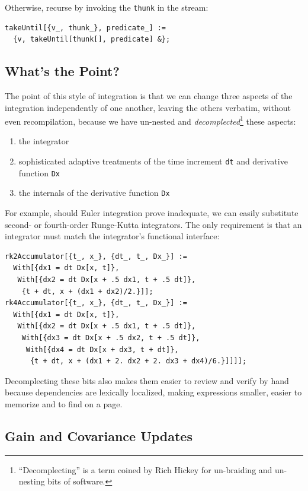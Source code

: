 \documentclass[10pt,oneside,x11names]{article}
\begin{document}
Otherwise, recurse by invoking the \texttt{thunk} in the stream:

\begin{verbatim}
takeUntil[{v_, thunk_}, predicate_] :=
  {v, takeUntil[thunk[], predicate] &};
\end{verbatim}

\subsection{What's the Point?}
\label{sec:orgheadline7}

The point of this style of integration is that we can change three aspects of
the integration independently of one another, leaving the others verbatim,
without even recompilation, because we have un-nested and \emph{decomplected}\footnote{``Decomplecting'' is a term coined by Rich Hickey for un-braiding and
un-nesting bits of software.} these aspects:
\begin{enumerate}
\item the integrator
\item sophisticated adaptive treatments of the time increment \texttt{dt} and derivative function \texttt{Dx}
\item the internals of the derivative function \texttt{Dx}
\end{enumerate}

For example, should Euler integration prove inadequate, we can easily substitute
second- or fourth-order Runge-Kutta integrators. The only requirement is that an
integrator must match the integrator's functional interface:

\begin{verbatim}
rk2Accumulator[{t_, x_}, {dt_, t_, Dx_}] :=
  With[{dx1 = dt Dx[x, t]},
   With[{dx2 = dt Dx[x + .5 dx1, t + .5 dt]},
    {t + dt, x + (dx1 + dx2)/2.}]];
rk4Accumulator[{t_, x_}, {dt_, t_, Dx_}] :=
  With[{dx1 = dt Dx[x, t]},
   With[{dx2 = dt Dx[x + .5 dx1, t + .5 dt]},
    With[{dx3 = dt Dx[x + .5 dx2, t + .5 dt]},
     With[{dx4 = dt Dx[x + dx3, t + dt]},
      {t + dt, x + (dx1 + 2. dx2 + 2. dx3 + dx4)/6.}]]]];
\end{verbatim}

Decomplecting these bits also makes them easier to review and verify by hand
because dependencies are lexically localized, making expressions smaller, easier
to memorize and to find on a page.

\subsection{Gain and Covariance Updates}
\label{sec:orgheadline8}
\end{document}

